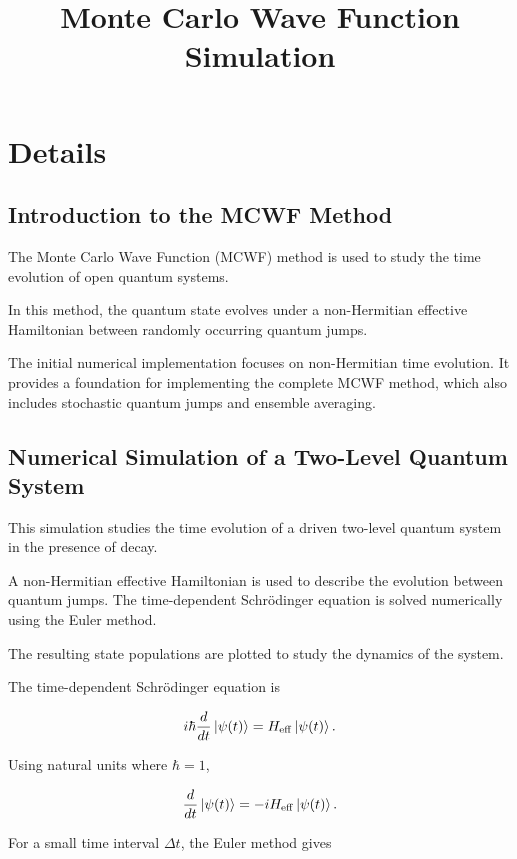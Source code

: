 \documentclass[12pt,a4paper]{report}
\title{Monte Carlo Wave Function Simulation}
\author{}
\date{}
\begin{document}
\maketitle

\chapter{Details}

\section{Introduction to the MCWF Method}

The Monte Carlo Wave Function (MCWF) method is used to
study the time evolution of open quantum systems.

In this method, the quantum state evolves under a
non-Hermitian effective Hamiltonian between randomly
occurring quantum jumps.

The initial numerical implementation focuses on
non-Hermitian time evolution. It provides a foundation
for implementing the complete MCWF method, which also
includes stochastic quantum jumps and ensemble averaging.

\section{Numerical Simulation of a Two-Level Quantum System}

This simulation studies the time evolution of a driven
two-level quantum system in the presence of decay.

A non-Hermitian effective Hamiltonian is used to describe
the evolution between quantum jumps. The time-dependent
Schrödinger equation is solved numerically using the
Euler method.

The resulting state populations are plotted to study
the dynamics of the system.

The time-dependent Schrödinger equation is

\begin{equation}
i\hbar\frac{d}{dt}\ket{\psi(t)}
=
H_{\mathrm{eff}}\ket{\psi(t)}.
\end{equation}

Using natural units where $\hbar=1$,

\begin{equation}
\frac{d}{dt}\ket{\psi(t)}
=
-iH_{\mathrm{eff}}\ket{\psi(t)}.
\end{equation}

For a small time interval $\Delta t$, the Euler method
gives
\end{document}
